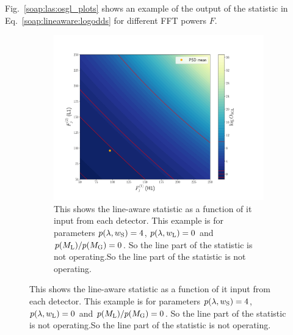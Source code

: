Fig.~\ref{soap:las:osgl_plots} shows an example of the output of the statistic in Eq.~\ref{soap:lineaware:logodds} for different \gls{FFT} powers $F$.
\begin{figure}
\centering

\begin{subfigure}[h]{\linewidth}
\begin{minipage}{0.65\linewidth}
\includegraphics[width=0.9\linewidth]{C3_soap/lookup_noline.pdf}
\end{minipage}\hfill
\begin{minipage}{0.35\linewidth}
\caption{This shows the line-aware statistic as a function of it input from each detector. This example is for parameters $p(\lambda,w_{\rm{S}}) = 4$, $p(\lambda,w_{\rm{L}}) = 0$ and $p(M_{\rm{L}})/p(M_{\rm{G}}) = 0$. So the line part of the statistic is not operating.So the line part of the statistic is not
operating.}
\label{soap:las:detp:noline}
\end{minipage}
\end{subfigure}


\end{figure}
